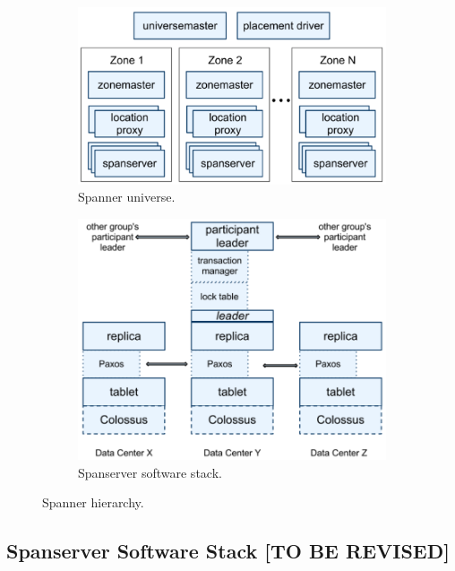 \documentclass[onecolumn, a4paper, 10pt]{article}
\newcommand{\tbr}{{\color{red}\textbf{[TO BE REVISED]}}}
\begin{document}
\begin{figure}[ht]
  \centering
  \begin{subfigure}{0.45\textwidth}
    \includegraphics[width = \textwidth]{figs/spanner-server-organization.png}
    \caption{Spanner universe.~\cite{Corbett:2012}}
    \label{subfig:spanner-universe}
  \end{subfigure}
  \hfill
  \begin{subfigure}{0.45\textwidth}
    \includegraphics[width = \textwidth]{figs/spanserver-software-stack.png}
    \caption{Spanserver software stack.~\cite{Corbett:2012}}
    \label{subfig:spanserver-software-stack}
  \end{subfigure}
  \caption{Spanner hierarchy.}
  \label{fig:spanner-hierarchy}
\end{figure}

\subsection{Spanserver Software Stack \tbr}
\label{subsec:spanserver-software-stack}
\end{document}
